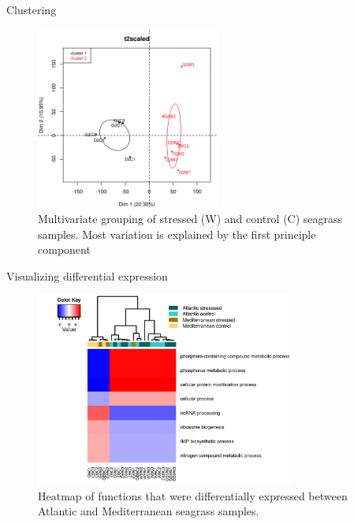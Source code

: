 \documentclass[presentation]{beamer}
\begin{document}
\begin{frame}[label=sec-4-1-2]{Clustering}
\begin{figure}[htb]
\centering
\includegraphics[width=6cm]{t2scaled_PCA.png}
\caption{Multivariate grouping of stressed (W) and control (C) seagrass samples. Most variation is explained by the first principle component}
\end{figure}
\end{frame}




\begin{frame}[label=sec-4-1-3]{Visualizing differential expression}
\begin{figure}[htb]
\centering
\includegraphics[width=8.5cm]{20140521_t9HeatMapCluster.png}
\caption{Heatmap of functions that were differentially expressed between Atlantic and Mediterranean seagrass samples.}
\end{figure}
\end{frame}
\end{document}
